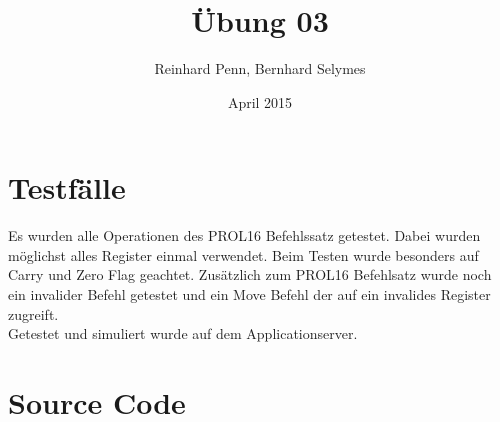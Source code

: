 \documentclass[12pt,a4paper]{article}
\begin{document}
\title{Übung 03}
\author{Reinhard Penn, Bernhard Selymes}
\date{April 2015}

\normalsize


\newcommand{\Uebung}{BFMSV}
\newcommand{\srcpath}{../../src}
\newcommand{\simpath}{../../sim}




\section{Testfälle}
Es wurden alle Operationen des PROL16 Befehlssatz getestet. Dabei wurden möglichst alles Register einmal verwendet. Beim Testen wurde besonders auf Carry und Zero Flag geachtet. Zusätzlich zum PROL16 Befehlsatz wurde noch ein invalider Befehl getestet und ein Move Befehl der auf ein invalides Register zugreift.
\\
Getestet und simuliert wurde auf dem Applicationserver.


\section{Source Code}











\end{document}
